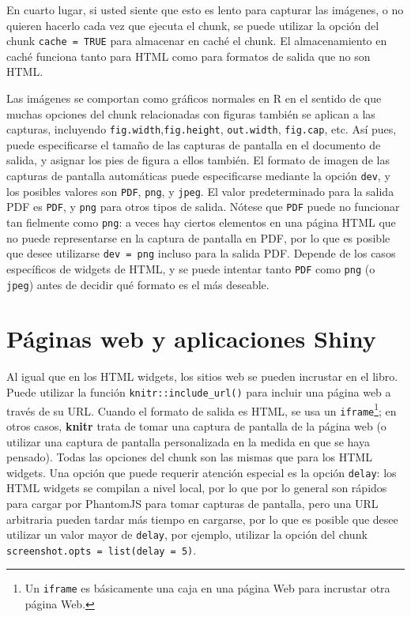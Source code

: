 \documentclass[12pt,]{krantz}
\theoremstyle{definition}
\theoremstyle{definition}
\theoremstyle{remark}
\begin{document}
En cuarto lugar, si usted siente que esto es lento para capturar las
imágenes, o no quieren hacerlo cada vez que ejecuta el chunk, se puede
utilizar la opción del chunk \texttt{cache\ =\ TRUE} para almacenar en
caché el chunk. El almacenamiento en caché funciona tanto para HTML como
para formatos de salida que no son HTML.

Las imágenes se comportan como gráficos normales en R en el sentido de
que muchas opciones del chunk relacionadas con figuras también se
aplican a las capturas, incluyendo
\texttt{fig.width},\texttt{fig.height}, \texttt{out.width},
\texttt{fig.cap}, etc. Así pues, puede especificarse el tamaño de las
capturas de pantalla en el documento de salida, y asignar los pies de
figura a ellos también. El formato de imagen de las capturas de pantalla
automáticas puede especificarse mediante la opción \texttt{dev}, y los
posibles valores son \texttt{PDF}, \texttt{png}, y \texttt{jpeg}. El
valor predeterminado para la salida PDF es \texttt{PDF}, y \texttt{png}
para otros tipos de salida. Nótese que \texttt{PDF} puede no funcionar
tan fielmente como \texttt{png}: a veces hay ciertos elementos en una
página HTML que no puede representarse en la captura de pantalla en PDF,
por lo que es posible que desee utilizarse
\texttt{dev\ =\ \textquotesingle{}png\textquotesingle{}} incluso para la
salida PDF. Depende de los casos específicos de widgets de HTML, y se
puede intentar tanto \texttt{PDF} como \texttt{png} (o \texttt{jpeg})
antes de decidir qué formato es el más deseable.

\section{Páginas web y aplicaciones
Shiny}\label{paginas-web-y-aplicaciones-shiny}

Al igual que en los HTML widgets, los sitios web se pueden incrustar en
el libro. Puede utilizar la función \texttt{knitr::include\_url()} para
incluir una página web a través de su URL. Cuando el formato de salida
es HTML, se usa un \texttt{iframe}\footnote{Un \texttt{iframe} es
  básicamente una caja en una página Web para incrustar otra página Web.};
en otros casos, \textbf{knitr} trata de tomar una captura de pantalla de
la página web (o utilizar una captura de pantalla personalizada en la
medida en que se haya pensado). Todas las opciones del chunk son las
mismas que para los HTML widgets. Una opción que puede requerir atención
especial es la opción \texttt{delay}: los HTML widgets se compilan a
nivel local, por lo que por lo general son rápidos para cargar por
PhantomJS para tomar capturas de pantalla, pero una URL arbitraria
pueden tardar más tiempo en cargarse, por lo que es posible que desee
utilizar un valor mayor de \texttt{delay}, por ejemplo, utilizar la
opción del chunk \texttt{screenshot.opts\ =\ list(delay\ =\ 5)}.
\end{document}
